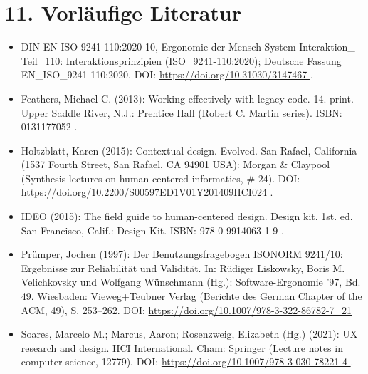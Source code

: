 \section*{11. Vorläufige Literatur}
\begin{itemize}
    \item DIN EN ISO 9241-110:2020-10, Ergonomie der Mensch-System-Interaktion\_- Teil\_110: Interaktionsprinzipien (ISO\_9241-110:2020); Deutsche Fassung EN\_ISO\_9241-110:2020. DOI: \url{https://doi.org/10.31030/3147467 }.
    
    \item Feathers, Michael C. (2013): Working effectively with legacy code. 14. print. Upper Saddle River, N.J.: Prentice Hall (Robert C. Martin series). ISBN: 0131177052  .
    
    \item Holtzblatt, Karen (2015): Contextual design. Evolved. San Rafael, California (1537 Fourth Street, San Rafael, CA 94901 USA): Morgan \& Claypool (Synthesis lectures on human-centered informatics, \# 24). DOI: \url{https://doi.org/10.2200/S00597ED1V01Y201409HCI024 }.
    
    \item IDEO (2015): The field guide to human-centered design. Design kit. 1st. ed. San Francisco, Calif.: Design Kit. ISBN: 978-0-9914063-1-9  .    

    \item Prümper, Jochen (1997): Der Benutzungsfragebogen ISONORM 9241/10: Ergebnisse zur Reliabilität und Validität. In: Rüdiger Liskowsky, Boris M. Velichkovsky und Wolfgang Wünschmann (Hg.): Software-Ergonomie ’97, Bd. 49. Wiesbaden: Vieweg+Teubner Verlag (Berichte des German Chapter of the ACM, 49), S. 253–262.  DOI: \url{https://doi.org/10.1007/978-3-322-86782-7_21 }

    \item Soares, Marcelo M.; Marcus, Aaron; Rosenzweig, Elizabeth (Hg.) (2021): UX research and design. HCI International. Cham: Springer (Lecture notes in computer science, 12779). DOI: \url{https://doi.org/10.1007/978-3-030-78221-4 }.

\end{itemize}